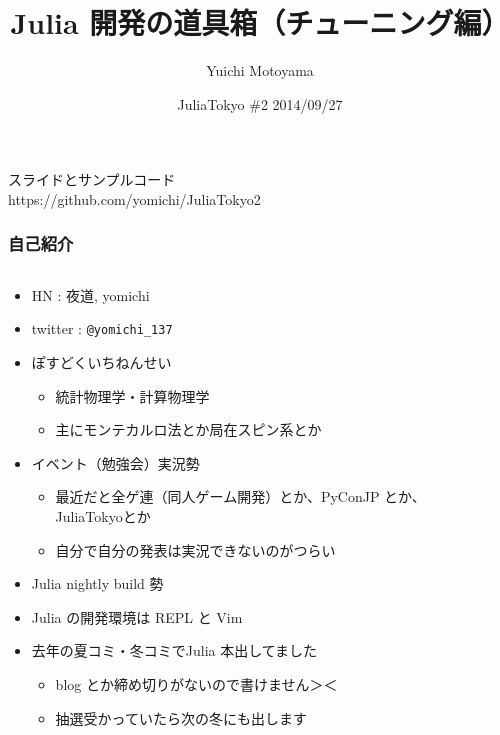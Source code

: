 \documentclass[dvipdfmx]{beamer}
\title{Julia 開発の道具箱（チューニング編）}
\author{Yuichi Motoyama}
\date{JuliaTokyo \#2 2014/09/27}
\begin{document}
\begin{frame}
  \titlepage
  スライドとサンプルコード \\ 
  https://github.com/yomichi/JuliaTokyo2
\end{frame}

\begin{frame}[containsverbatim]
  \frametitle{自己紹介}
  \begin{columns}
    \begin{column}{.8\linewidth}
  \begin{itemize}
    \item HN : 夜道, yomichi
    \item twitter : \verb|@yomichi_137|
    \item ぽすどくいちねんせい
      \begin{itemize}
        \item 統計物理学・計算物理学
        \item 主にモンテカルロ法とか局在スピン系とか
      \end{itemize}
    \item イベント（勉強会）実況勢
      \begin{itemize}
        \item 最近だと全ゲ連（同人ゲーム開発）とか、PyConJP とか、JuliaTokyoとか
        \item 自分で自分の発表は実況できないのがつらい
      \end{itemize}
    \item Julia nightly build 勢
    \item Julia の開発環境は REPL と Vim
    \item 去年の夏コミ・冬コミでJulia 本出してました
      \begin{itemize}
        \item blog とか締め切りがないので書けません＞＜
        \item 抽選受かっていたら次の冬にも出します
      \end{itemize}
  \end{itemize}
\end{column}
\begin{column}{.3\linewidth}

\end{column}
\end{columns}
\end{frame}
\end{document}
